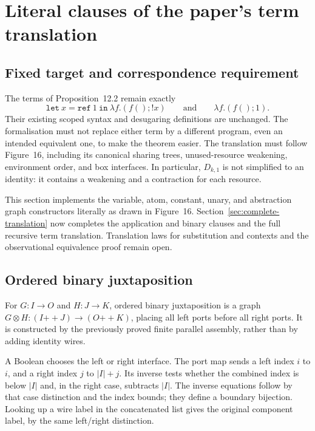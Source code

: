 \clearpage
\section{Literal clauses of the paper's term translation}
\label{sec:literal-translation}
\subsection{Fixed target and correspondence requirement}
The terms of Proposition~12.2 remain exactly
\[
 \mathtt{let}\ x=\mathtt{ref}\ 1\ \mathtt{in}\ \lambda f.(f();!x)
 \qquad\text{and}\qquad
 \lambda f.(f();1).
\]
Their existing scoped syntax and desugaring definitions are unchanged.
The formalisation must not replace either term by a different program, even
an intended equivalent one, to make the theorem easier. The translation
must follow Figure~16, including its canonical sharing trees, unused-resource
weakening, environment order, and box interfaces. In particular,
$D_{k,1}$ is not simplified to an identity: it contains a weakening and a
contraction for each resource.

This section implements the variable, atom, constant, unary, and abstraction
graph constructors literally as drawn in Figure~16. Section~\ref{sec:complete-translation}
now completes the application and binary clauses and the full recursive
term translation. Translation laws for substitution and contexts and the
observational equivalence proof remain open.

\subsection{Ordered binary juxtaposition}
For $G:I\to O$ and $H:J\to K$, ordered binary juxtaposition is a graph
$G\otimes H:(I\mathbin{+\!+}J)\to(O\mathbin{+\!+}K)$, placing all left
ports before all right ports. It is constructed by the previously proved
finite parallel assembly, rather than by adding identity wires.

A Boolean chooses the left or right interface. The port map sends a left
index $i$ to $i$, and a right index $j$ to $|I|+j$. Its inverse tests whether
the combined index is below $|I|$ and, in the right case, subtracts $|I|$.
The inverse equations follow by that case distinction and the index bounds;
they define a boundary bijection. Looking up a wire label in the concatenated
list gives the original component label, by the same left/right distinction.


